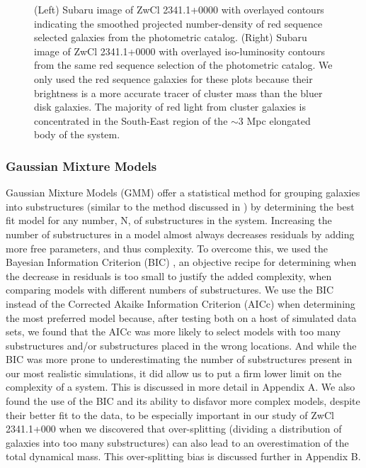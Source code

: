 \documentclass[onecolumn]{aastex}
\begin{document}
\begin{figure} 
\caption{(Left) Subaru image of ZwCl 2341.1+0000 with overlayed contours indicating the smoothed projected number-density of red sequence selected galaxies from the photometric catalog. (Right) Subaru image of ZwCl 2341.1+0000 with overlayed iso-luminosity contours from the same red sequence selection of the photometric catalog.  We only used the red sequence galaxies for these plots because their brightness is a more accurate tracer of cluster mass than the bluer disk galaxies. The majority of red light from cluster galaxies is concentrated in the South-East region of the $\sim$3 Mpc elongated body of the system.\label{fig7}} 
\end{figure}


\subsubsection{Gaussian Mixture Models}
Gaussian Mixture Models (GMM) offer a statistical method for grouping galaxies into substructures (similar to the method discussed in \cite{Dawson15}) by determining the best fit model for any number, N, of substructures in the system.  Increasing the number of substructures in a model almost always decreases residuals by adding more free parameters, and thus complexity.  To overcome this, we used the Bayesian Information Criterion (BIC) \citep{Liddle04}, an objective recipe for determining when the decrease in residuals is too small to justify the added complexity, when comparing models with different numbers of substructures.  We use the BIC instead of the Corrected Akaike Information Criterion (AICc) \citep{Hurvich89} when determining the most preferred model because, after testing both on a host of simulated data sets, we found that the AICc was more likely to select models with too many substructures and/or substructures placed in the wrong locations.  And while the BIC was more prone to underestimating the number of substructures present in our most realistic simulations, it did allow us to put a firm lower limit on the complexity of a system.  This is discussed in more detail in Appendix A.  We also found the use of the BIC and its ability to disfavor more complex models, despite their better fit to the data, to be especially important in our study of ZwCl 2341.1+000 when we discovered that over-splitting (dividing a distribution of galaxies into too many substructures) can also lead to an overestimation of the total dynamical mass.  This over-splitting bias is discussed further in Appendix B.
\end{document}
